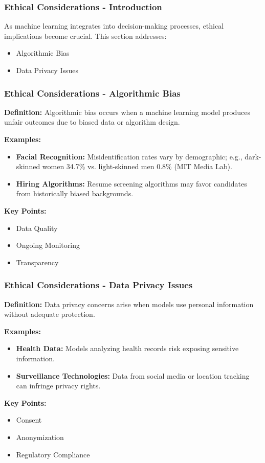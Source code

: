 \documentclass{beamer}
\begin{document}
\begin{frame}[fragile]
    \frametitle{Ethical Considerations - Introduction}
    As machine learning integrates into decision-making processes, ethical implications become crucial. This section addresses:
    \begin{itemize}
        \item Algorithmic Bias
        \item Data Privacy Issues
    \end{itemize}
\end{frame}

\begin{frame}[fragile]
    \frametitle{Ethical Considerations - Algorithmic Bias}
    \textbf{Definition:} Algorithmic bias occurs when a machine learning model produces unfair outcomes due to biased data or algorithm design.
    
    \textbf{Examples:}
    \begin{itemize}
        \item \textbf{Facial Recognition:} Misidentification rates vary by demographic; e.g., dark-skinned women 34.7\% vs. light-skinned men 0.8\% (MIT Media Lab).
        \item \textbf{Hiring Algorithms:} Resume screening algorithms may favor candidates from historically biased backgrounds.
    \end{itemize}
    
    \textbf{Key Points:}
    \begin{itemize}
        \item Data Quality
        \item Ongoing Monitoring
        \item Transparency
    \end{itemize}
\end{frame}

\begin{frame}[fragile]
    \frametitle{Ethical Considerations - Data Privacy Issues}
    \textbf{Definition:} Data privacy concerns arise when models use personal information without adequate protection.
    
    \textbf{Examples:}
    \begin{itemize}
        \item \textbf{Health Data:} Models analyzing health records risk exposing sensitive information.
        \item \textbf{Surveillance Technologies:} Data from social media or location tracking can infringe privacy rights.
    \end{itemize}
    
    \textbf{Key Points:}
    \begin{itemize}
        \item Consent
        \item Anonymization
        \item Regulatory Compliance
    \end{itemize}
\end{frame}
\end{document}

